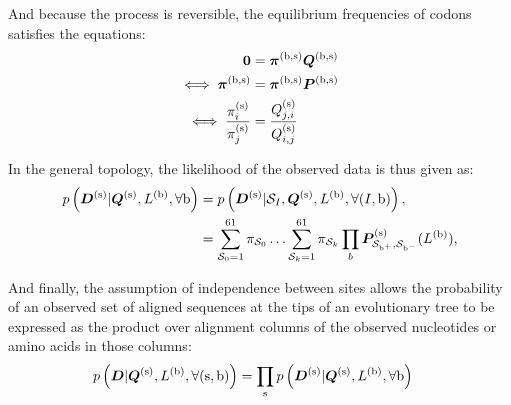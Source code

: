 And because the process is reversible, the equilibrium frequencies of codons satisfies the equations:
\begin{align}
\bm{0}  & = \bm{\pi}^{(\text{b}, \text{s})} \bm{Q}^{(\text{b}, \text{s})} \\
\iff \bm{\pi}^{(\text{b}, \text{s})} & = \bm{\pi}^{(\text{b}, \text{s})} \bm{P}^{(\text{b}, \text{s})} \\
\iff \dfrac{\pi_{{i}}^{(\text{s})}}{\pi_{{j}}^{(\text{s})}} & = \dfrac{Q_{{j}, {i}}^{(\text{s})}}{Q_{{i}, {j}}^{(\text{s})}}
\end{align}

In the general topology, the likelihood of the observed data is thus given as:
\begin{align}
p\left(\bm{D}^{(\text{s})}| \bm{Q}^{(\text{s})}, L^{(\text{b})}, \forall \text{b} \right) & = p\left(\bm{D}^{(\text{s})}| \mathcal{S}_{I}, \bm{Q}^{(\text{s})}, L^{(\text{b})}, \forall (I, \text{b}) \right), \\
& = \sum_{\mathcal{S}_{0}=1}^{61} \pi_{\mathcal{S}_{0}} \hdots \sum_{\mathcal{S}_{k}=1}^{61} \pi_{\mathcal{S}_{k}} \prod_{b} \bm{P}^{(\text{s})}_{\mathcal{S}_{\text{b}^{+}}, \mathcal{S}_{\text{b}^{-}}}(L^{(\text{b})}), \label{eq:likelihood-site}
\end{align}

And finally, the assumption of independence between sites allows the probability of an observed set of aligned sequences at the tips of an evolutionary tree to be expressed as the product over alignment columns of the observed nucleotides or amino acids in those columns:
\begin{align}
p\left(\bm{D}| \bm{Q}^{(\text{s})}, L^{(\text{b})}, \forall (\text{s}, \text{b}) \right) & = \prod_{\text{s}} p\left(\bm{D}^{(\text{s})}| \bm{Q}^{(\text{s})}, L^{(\text{b})}, \forall \text{b} \right) \label{eq:likelihood}
\end{align} 
